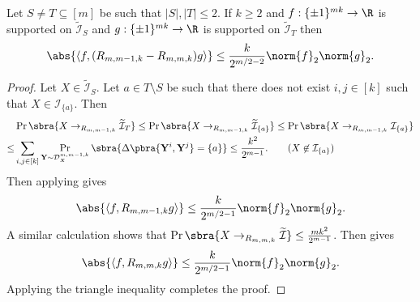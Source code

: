 \begin{lemma}\label{lem:cross terms B=1 to B=1}
    Let $S\neq T\subseteq[m]$ be such that $|S|,|T|\leq 2$. If $k\geq 2$ and $f:\{\pm1\}^{mk}\to\R$ is supported on $\widetilde{\mathcal{I}}_S$ and $g:\{\pm1\}^{mk}\to\R$ is supported on $\widetilde{\mathcal{I}}_T$ then 
    \begin{align*}
       \abs{ \left\langle f,(R_{m,m-1,k}-R_{m,m,k})g\right\rangle }\leq\frac{k}{2^{m/2-2}}\norm{f}_2\norm{g}_2.
    \end{align*}
\end{lemma}
\begin{proof}
    Let $X\in\widetilde{\mathcal{I}}_S$. Let $a\in T\setminus S$ be such that there does not exist $i,j\in[k]$ such that $X\in \mathcal{I}_{\{a\}}$. Then 
    \begin{align*}
        &\Pr\sbra{X\to_{R_{m,m-1,k}} \widetilde{\mathcal{I}}_T}
        \leq \Pr\sbra{X\to_{R_{m,m-1,k}} \widetilde{\mathcal{I}}_{\{a\}}}
        \leq \Pr\sbra{X\to_{R_{m,m-1,k}} {\mathcal{I}}_{\{a\}}}\\
        \leq & \sum_{i,j\in[k]}\Pr_{\mathbf{Y}\sim \mathcal{D}_X^{m,m-1,k}}\sbra{\Delta\pbra{\mathbf{Y}^i,\mathbf{Y}^j}=\{a\}}
        \leq \frac{k^2}{2^{m-1}}.\tag{$X\not\in\mathcal{I}_{\{a\}}$}
    \end{align*}
    Then applying  gives
    \begin{align*}
        \abs{ \left\langle f,R_{m,m-1,k}g\right\rangle }\leq\frac{k}{2^{m/2-1}}\norm{f}_2\norm{g}_2.
    \end{align*}
    A similar calculation shows that $\Pr\sbra{X\to_{R_{m,m,k}} \widetilde{\mathcal{I}}}\leq \frac{mk^2}{2^{m-1}}$. Then  gives
    \begin{align*}
        \abs{ \left\langle f,R_{m,m,k}g\right\rangle }\leq\frac{k}{2^{m/2-1}}\norm{f}_2\norm{g}_2.
    \end{align*}
    Applying the triangle inequality completes the proof.
\end{proof}



